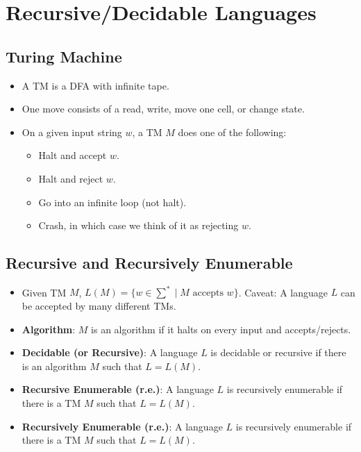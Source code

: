 
\section{Recursive/Decidable Languages}

\subsection{Turing Machine}
\begin{itemize}
    \item A TM is a DFA with infinite tape.
    \item One move consists of a read, write, move one cell, or change state.
    \item On a given input string $w$, a TM $M$ does one of the following:
    \begin{itemize}
        \item Halt and accept $w$.
        \item Halt and reject $w$.
        \item Go into an infinite loop (not halt).
        \item Crash, in which case we think of it as rejecting $w$.
    \end{itemize}
\end{itemize}

\subsection{Recursive and Recursively Enumerable}
\begin{itemize}
    \item Given TM $M$, $L(M) = \{ w \in \sum^\ast \mid \text{$M$ accepts $w$} \}$. Caveat: A language $L$ can be accepted by many different TMs.
    \item \textbf{Algorithm}: $M$ is an algorithm if it halts on every input and accepts/rejects.
    \item \textbf{Decidable (or Recursive)}: A language $L$ is decidable or recursive if there is an algorithm $M$ such that $L = L(M)$.
    \item \textbf{Recursive Enumerable (r.e.)}: A language $L$ is recursively enumerable if there is a TM $M$ such that $L = L(M)$.
    \item \textbf{Recursively Enumerable (r.e.)}: A language $L$ is recursively enumerable if there is a TM $M$ such that $L = L(M)$.
\end{itemize}

